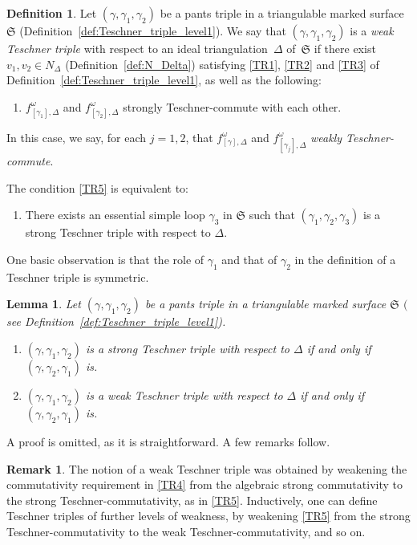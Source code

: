 \documentclass[10pt,a4paper]{amsart}
\numberwithin{equation}{section}
\newtheorem{Lemma}[Theorem]{Lemma}
\theoremstyle{definition}
\newtheorem{Definition}[Theorem]{Definition}
\newtheorem{Remark}[Theorem]{Remark}
\begin{document}
\begin{Definition}
\label{def:Teschner_triple_level2}
Let $(\gamma,\gamma_1,\gamma_2)$ be a pants triple in a triangulable marked surface $\mathfrak{S}$ (Definition~\ref{def:Teschner_triple_level1}). We say that $(\gamma,\gamma_1,\gamma_2)$ is a {\em weak Teschner triple} with respect to an ideal triangulation~$\Delta$ of~$\mathfrak{S}$ if there exist $v_1, v_2 \in N_\Delta$ (Definition~\ref{def:N_Delta}) satisfying \ref{TR1}, \ref{TR2} and \ref{TR3} of Definition~\ref{def:Teschner_triple_level1}, as well as the following:
\begin{enumerate}[label={\rm (TR\arabic*)}]\itemsep=0pt\setlength{\leftskip}{0.28cm}
\setcounter{enumi}{4}
\item\label{TR5} $f^\omega_{[\gamma_1],\Delta}$ and $f^\omega_{[\gamma_2],\Delta}$ strongly Teschner-commute with each other.
\end{enumerate}
In this case, we say, for each $j=1,2$, that $f^\omega_{[\gamma],\Delta}$ and $f^\omega_{[\gamma_j],\Delta}$ {\em weakly Teschner-commute}.
\end{Definition}
The condition \ref{TR5} is equivalent to:
\begin{enumerate}[label={\rm (TR\arabic*$'$)}]\itemsep=0pt\setlength{\leftskip}{0.38cm}
\setcounter{enumi}{4}
\item\label{TR5_prime} There exists an essential simple loop $\gamma_3$ in $\mathfrak{S}$ such that $(\gamma_1,\gamma_2,\gamma_3)$ is a strong Teschner triple with respect to $\Delta$.
\end{enumerate}
One basic observation is that the role of $\gamma_1$ and that of $\gamma_2$ in the definition of a Teschner triple is symmetric.
\begin{Lemma}
Let $(\gamma,\gamma_1,\gamma_2)$ be a pants triple in a triangulable marked surface $\mathfrak{S}$ $($see Definition~{\rm \ref{def:Teschner_triple_level1})}.
\begin{enumerate}\itemsep=0pt
\item[$(1)$] $(\gamma,\gamma_1,\gamma_2)$ is a strong Teschner triple with respect to $\Delta$ if and only if $(\gamma,\gamma_2,\gamma_1)$ is.
\item[$(2)$] $(\gamma,\gamma_1,\gamma_2)$ is a weak Teschner triple with respect to $\Delta$ if and only if $(\gamma,\gamma_2,\gamma_1)$ is.
\end{enumerate}
\end{Lemma}
A proof is omitted, as it is straightforward.
A few remarks follow.
\begin{Remark}\label{rem:further_weakness}
The notion of a weak Teschner triple was obtained by weakening the commutativity requirement in \ref{TR4} from the algebraic strong commutativity to the strong Teschner-commutativity, as in \ref{TR5}. Inductively, one can define Teschner triples of further levels of weakness, by weakening \ref{TR5} from the strong Teschner-commutativity to the weak Teschner-commutativity, and so on.
\end{Remark}
\end{document}
